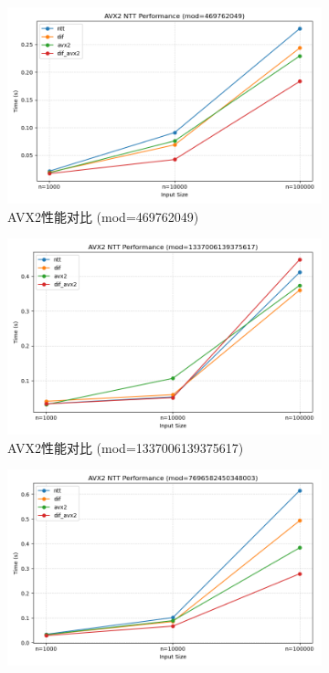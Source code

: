\documentclass[a4paper,colorlinks=true,linkcolor=blue,urlcolor=blue,citecolor=green,bookmarks=true]{article}
\begin{document}
\begin{figure}[H]
  \centering
  \begin{subfigure}[b]{0.32\textwidth}
    \centering
    \includegraphics[width=\textwidth]{avx2_469762049.png}
    \caption{AVX2性能对比 (mod=469762049)}
    \label{fig:avx2_469762049}
  \end{subfigure}
  \hfill
  \begin{subfigure}[b]{0.32\textwidth}
    \centering
    \includegraphics[width=\textwidth]{avx2_1337006139375617.png}
    \caption{AVX2性能对比 (mod=1337006139375617)}
    \label{fig:avx2_1337006139375617}
  \end{subfigure}
  \hfill
  \begin{subfigure}[b]{0.32\textwidth}
    \centering
    \includegraphics[width=\textwidth]{avx2_7696582450348003.png}

\end{subfigure}
\end{figure}
\end{document}
